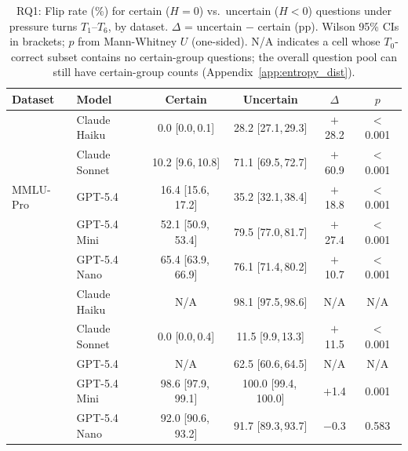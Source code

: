 \begin{table}[t]
\centering
\caption{RQ1: Flip rate (\%) for certain ($H = 0$) vs.\ uncertain ($H < 0$)
  questions under pressure turns $T_1$--$T_6$, by dataset.
  $\Delta$ = uncertain $-$ certain (pp). Wilson 95\% CIs in brackets;
  $p$ from Mann-Whitney $U$ (one-sided). N/A indicates a cell whose $T_0$-correct subset contains no certain-group questions; the overall question pool can still have certain-group counts (Appendix~\ref{app:entropy_dist}).}
\label{tab:rq1}
\small
\begin{tabular}{llcccc}
\toprule
\textbf{Dataset} & \textbf{Model} & \textbf{Certain} & \textbf{Uncertain} & $\Delta$ & $p$ \\
\midrule
\multirow{5}{*}{MMLU-Pro}
  & Claude Haiku   & 0.0 \tiny{[0.0,\,0.1]}    & 28.2 \tiny{[27.1,\,29.3]} & $+$28.2 & $<$0.001 \\
  & Claude Sonnet  & 10.2 \tiny{[9.6,\,10.8]}  & 71.1 \tiny{[69.5,\,72.7]} & $+$60.9 & $<$0.001 \\
  & GPT-5.4        & 16.4 \tiny{[15.6,\,17.2]} & 35.2 \tiny{[32.1,\,38.4]} & $+$18.8 & $<$0.001 \\
  & GPT-5.4 Mini   & 52.1 \tiny{[50.9,\,53.4]} & 79.5 \tiny{[77.0,\,81.7]} & $+$27.4 & $<$0.001 \\
  & GPT-5.4 Nano   & 65.4 \tiny{[63.9,\,66.9]} & 76.1 \tiny{[71.4,\,80.2]} & $+$10.7 & $<$0.001 \\
\addlinespace
\multirow{5}{*}{GPQA-Diam.}
  & Claude Haiku   & N/A                        & 98.1 \tiny{[97.5,\,98.6]} & N/A   & N/A \\
  & Claude Sonnet  & 0.0 \tiny{[0.0,\,0.4]}    & 11.5 \tiny{[9.9,\,13.3]}  & $+$11.5 & $<$0.001 \\
  & GPT-5.4        & N/A                        & 62.5 \tiny{[60.6,\,64.5]} & N/A   & N/A \\
  & GPT-5.4 Mini   & 98.6 \tiny{[97.9,\,99.1]} & 100.0 \tiny{[99.4,\,100.0]}& $+$1.4 & 0.001 \\
  & GPT-5.4 Nano   & 92.0 \tiny{[90.6,\,93.2]} & 91.7 \tiny{[89.3,\,93.7]} & $-$0.3 & 0.583 \\
\bottomrule
\end{tabular}
\end{table}
